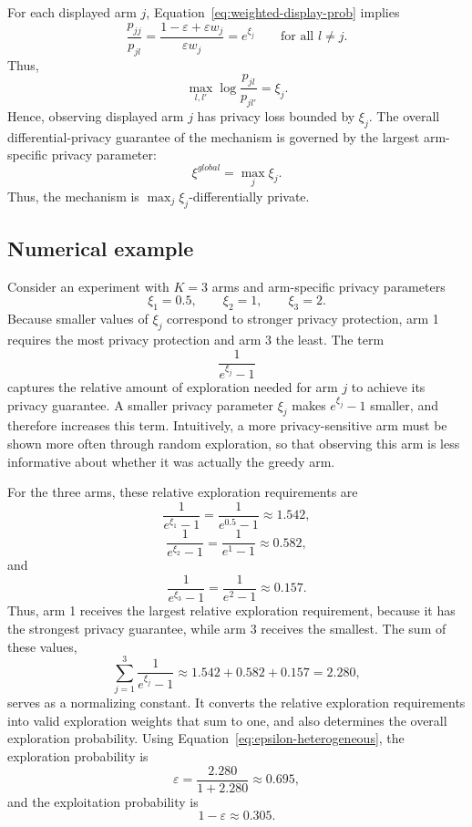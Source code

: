 \documentclass[mksc,nonblindrev]{informs3}
\begin{document}
\begin{APPENDICES}
For each displayed arm $j$, Equation~\eqref{eq:weighted-display-prob} implies
\begin{equation}
\label{eq:privacy-ratio-final}
\frac{p_{jj}}{p_{jl}}
=
\frac{1-\varepsilon+\varepsilon w_j}{\varepsilon w_j}
=
e^{\xi_j}
\qquad \text{for all } l\neq j.
\end{equation}
Thus,
\begin{equation}
\label{eq:arm-specific-privacy-loss}
\max_{l,l'} \log \frac{p_{jl}}{p_{jl'}}
=
\xi_j.
\end{equation}
Hence, observing displayed arm $j$ has privacy loss bounded by $\xi_j$. The overall differential-privacy guarantee of the mechanism is governed by the largest arm-specific privacy parameter:
\begin{equation}
\label{eq:global-privacy}
\xi^{global}
=
\max_j \xi_j.
\end{equation}
Thus, the mechanism is $\max_j \xi_j$-differentially private.

\subsection{Numerical example}
Consider an experiment with $K=3$ arms and arm-specific privacy parameters
\[
\xi_1=0.5,\qquad
\xi_2=1,\qquad
\xi_3=2.
\]
Because smaller values of $\xi_j$ correspond to stronger privacy protection, arm 1 requires the most privacy protection and arm 3 the least. The term
\[
\frac{1}{e^{\xi_j}-1}
\]
captures the relative amount of exploration needed for arm $j$ to achieve its privacy guarantee. A smaller privacy parameter $\xi_j$ makes $e^{\xi_j}-1$ smaller, and therefore increases this term. Intuitively, a more privacy-sensitive arm must be shown more often through random exploration, so that observing this arm is less informative about whether it was actually the greedy arm.

For the three arms, these relative exploration requirements are
\[
\frac{1}{e^{\xi_1}-1}
=
\frac{1}{e^{0.5}-1}
\approx 1.542,
\]
\[
\frac{1}{e^{\xi_2}-1}
=
\frac{1}{e^1-1}
\approx 0.582,
\]
and
\[
\frac{1}{e^{\xi_3}-1}
=
\frac{1}{e^2-1}
\approx 0.157.
\]
Thus, arm 1 receives the largest relative exploration requirement, because it has the strongest privacy guarantee, while arm 3 receives the smallest. The sum of these values,
\[
\sum_{j=1}^3 \frac{1}{e^{\xi_j}-1}
\approx
1.542+0.582+0.157
=
2.280,
\]
serves as a normalizing constant. It converts the relative exploration requirements into valid exploration weights that sum to one, and also determines the overall exploration probability. Using Equation~\eqref{eq:epsilon-heterogeneous}, the exploration probability is
\[
\varepsilon
=
\frac{2.280}{1+2.280}
\approx
0.695,
\]
and the exploitation probability is
\[
1-\varepsilon
\approx
0.305.
\]


\end{APPENDICES}
\end{document}
